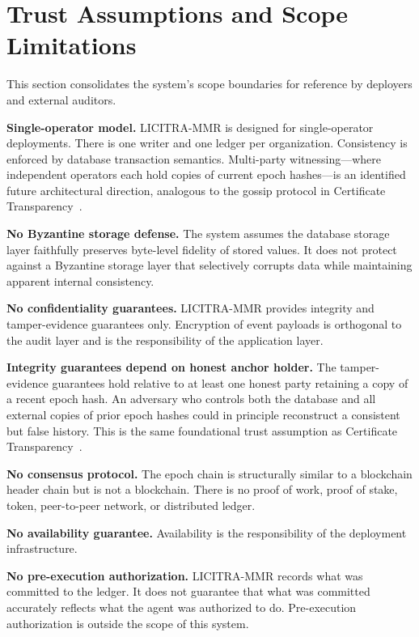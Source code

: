 \documentclass{article}
\begin{document}
\section{Trust Assumptions and Scope Limitations}
\label{sec:trustscope}

This section consolidates the system's scope boundaries for reference by
deployers and external auditors.

\textbf{Single-operator model.} LICITRA-MMR is designed for single-operator
deployments. There is one writer and one ledger per organization. Consistency
is enforced by database transaction semantics. Multi-party witnessing---where
independent operators each hold copies of current epoch hashes---is an
identified future architectural direction, analogous to the gossip protocol in
Certificate Transparency~\cite{laurie2013}.

\textbf{No Byzantine storage defense.} The system assumes the database storage
layer faithfully preserves byte-level fidelity of stored values. It does not
protect against a Byzantine storage layer that selectively corrupts data while
maintaining apparent internal consistency.

\textbf{No confidentiality guarantees.} LICITRA-MMR provides integrity and
tamper-evidence guarantees only. Encryption of event payloads is orthogonal to
the audit layer and is the responsibility of the application layer.

\textbf{Integrity guarantees depend on honest anchor holder.} The tamper-evidence
guarantees hold relative to at least one honest party retaining a copy of a
recent epoch hash. An adversary who controls both the database and all external
copies of prior epoch hashes could in principle reconstruct a consistent but
false history. This is the same foundational trust assumption as Certificate
Transparency~\cite{laurie2013}.

\textbf{No consensus protocol.} The epoch chain is structurally similar to a
blockchain header chain but is not a blockchain. There is no proof of work,
proof of stake, token, peer-to-peer network, or distributed ledger.

\textbf{No availability guarantee.} Availability is the responsibility of the
deployment infrastructure.

\textbf{No pre-execution authorization.} LICITRA-MMR records what was committed
to the ledger. It does not guarantee that what was committed accurately reflects
what the agent was authorized to do. Pre-execution authorization is outside the
scope of this system.
\end{document}
